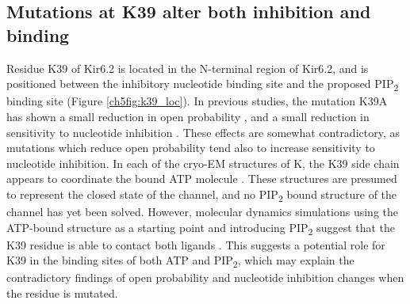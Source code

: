 \subsection{Mutations at K39 alter both inhibition and binding}

Residue K39 of Kir6.2 is located in the N-terminal region of Kir6.2, and is positioned between the inhibitory nucleotide binding site and the proposed PIP\textsubscript{2} binding site (Figure \ref{ch5fig:k39_loc}).
In previous studies, the mutation K39A has shown a small reduction in open probability \cite{cukras_role_2002}, and a small reduction in sensitivity to nucleotide inhibition \cite{cukras_role_2002, tucker_molecular_1998}.
These effects are somewhat contradictory, as mutations which reduce open probability tend also to increase sensitivity to nucleotide inhibition.
In each of the cryo-EM structures of K\ATP{}, the K39 side chain appears to coordinate the bound ATP molecule \cite{lee_molecular_2017, martin_anti-diabetic_2017, li_structure_2017, puljung_cryo-electron_2018-1}.
These structures are presumed to represent the closed state of the channel, and no PIP\textsubscript{2} bound structure of the channel has yet been solved.
However, molecular dynamics simulations using the ATP-bound structure as a starting point and introducing PIP\textsubscript{2} suggest that the K39 residue is able to contact both ligands \cite{pipatpolkai_dynamic_2021}.
This suggests a potential role for K39 in the binding sites of both ATP and PIP\textsubscript{2}, which may explain the contradictory findings of open probability and nucleotide inhibition changes when the residue is mutated.

